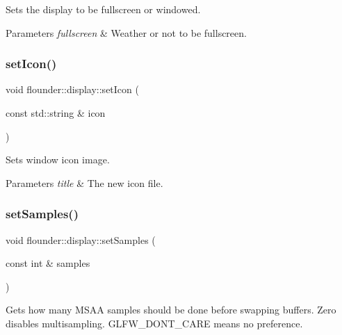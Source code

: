 Sets the display to be fullscreen or windowed. 


\begin{DoxyParams}{Parameters}
{\em fullscreen} & Weather or not to be fullscreen. \\
\hline
\end{DoxyParams}
\mbox{\label{classflounder_1_1display_a49ba8d850f666496fabf9133d01091ab}} 
\subsubsection{\texorpdfstring{set\+Icon()}{setIcon()}}
{\footnotesize\ttfamily void flounder\+::display\+::set\+Icon (\begin{DoxyParamCaption}\item[{const std\+::string \&}]{icon }\end{DoxyParamCaption})}



Sets window icon image. 


\begin{DoxyParams}{Parameters}
{\em title} & The new icon file. \\
\hline
\end{DoxyParams}
\mbox{\label{classflounder_1_1display_ae1bf2028faaf411fedc80ca511a2e739}} 
\subsubsection{\texorpdfstring{set\+Samples()}{setSamples()}}
{\footnotesize\ttfamily void flounder\+::display\+::set\+Samples (\begin{DoxyParamCaption}\item[{const int \&}]{samples }\end{DoxyParamCaption})\hspace{0.3cm}{\ttfamily [inline]}}



Gets how many M\+S\+AA samples should be done before swapping buffers. Zero disables multisampling. G\+L\+F\+W\+\_\+\+D\+O\+N\+T\+\_\+\+C\+A\+RE means no preference. 


